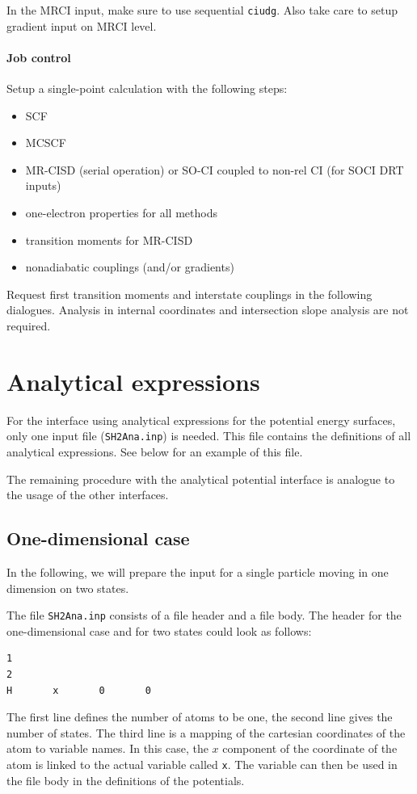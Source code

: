 \documentclass[a4paper,11pt,DIV=15,openany]{scrbook}
\newcommand{\ttt}[1]{\texttt{#1}}
\begin{document}
In the MRCI input, make sure to use sequential \ttt{ciudg}. Also take care to setup gradient input on MRCI level.

\paragraph{Job control}

Setup a single-point calculation with the following steps:
\begin{itemize}
  \item SCF
  \item MCSCF
  \item MR-CISD (serial operation) or SO-CI coupled to non-rel CI (for SOCI DRT inputs)
  \item one-electron properties for all methods
  \item transition moments for MR-CISD
  \item nonadiabatic couplings (and/or gradients)
\end{itemize}

Request first transition moments and interstate couplings in the following dialogues. Analysis in internal coordinates and intersection slope analysis are not required.



\section{Analytical expressions}

For the interface using analytical expressions for the potential energy surfaces, only one input file (\ttt{SH2Ana.inp}) is needed. This file contains the definitions of all analytical expressions. See below for an example of this file.

The remaining procedure with the analytical potential interface is analogue to the usage of the other interfaces.

\subsection{One-dimensional case}

In the following, we will prepare the input for a single particle moving in one dimension on two states.

The file \ttt{SH2Ana.inp} consists of a file header and a file body. The header for the one-dimensional case and for two states could look as follows:
\begin{oframed}
\footnotesize\begin{Verbatim}[commandchars=\\\{\}]
1
2
H       x       0       0
\end{Verbatim}
\end{oframed}
The first line defines the number of atoms to be one, the second line gives the number of states. The third line is a mapping of the cartesian coordinates of the atom to variable names. In this case, the $x$ component of the coordinate of the atom is linked to the actual variable called \ttt{x}. The variable can then be used in the file body in the definitions of the potentials.
\end{document}
